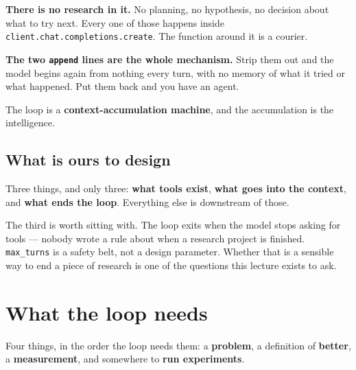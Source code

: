 \documentclass[11pt]{article}
\newcommand{\keyidea}[1]{\begin{idea}#1\end{idea}}
\newcommand{\runin}[1]{\smallskip\noindent\textbf{#1}\quad}
\begin{document}
\runin{There is no research in it.}
No planning, no hypothesis, no decision about what to try next. Every one of those happens
inside \texttt{client.chat.completions.create}. The function around it is a courier.

\runin{The two \texttt{append} lines are the whole mechanism.}
Strip them out and the model begins again from nothing every turn, with no memory of what it
tried or what happened. Put them back and you have an agent.

\keyidea{The loop is a \textbf{context-accumulation machine}, and the accumulation is the
intelligence.}

\subsection{What is ours to design}

Three things, and only three: \textbf{what tools exist}, \textbf{what goes into the context},
and \textbf{what ends the loop}. Everything else is downstream of those.

The third is worth sitting with. The loop exits when the model stops asking for tools --- nobody
wrote a rule about when a research project is finished. \texttt{max\_turns} is a safety belt, not
a design parameter. Whether that is a sensible way to end a piece of research is one of the
questions this lecture exists to ask.

\section{What the loop needs}

Four things, in the order the loop needs them: a \textbf{problem}, a definition of
\textbf{better}, a \textbf{measurement}, and somewhere to \textbf{run experiments}.

\begin{center}
\end{center}
\end{document}
